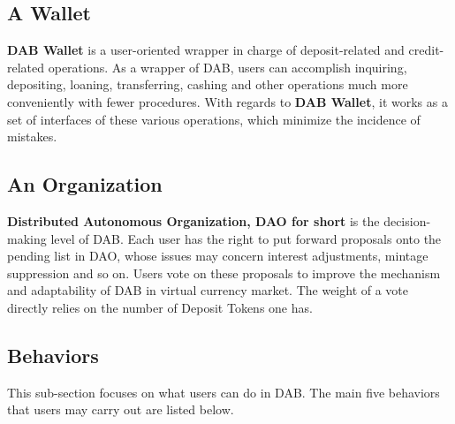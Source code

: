 \documentclass[review]{elsarticle}
\begin{document}
\subsection{A Wallet}
\textbf{DAB Wallet} is a user-oriented wrapper in charge of deposit-related and credit-related operations. As a wrapper of DAB, users can accomplish inquiring, depositing, loaning, transferring, cashing and other operations much more conveniently with fewer procedures. With regards to \textbf{DAB Wallet}, it works as a set of interfaces of these various operations, which minimize the incidence of mistakes.

\subsection{An Organization}
\textbf{Distributed Autonomous Organization, DAO for short} is the decision-making level of DAB. Each user has the right to put forward proposals onto the pending list in DAO, whose issues may concern interest adjustments, mintage suppression and so on. Users vote on these proposals to improve the mechanism and adaptability of DAB in virtual currency market. The weight of a vote directly relies on the number of Deposit Tokens one has.

\subsection{Behaviors}
This sub-section focuses on what users can do in DAB. The main five behaviors that users may carry out are listed below.
\end{document}
